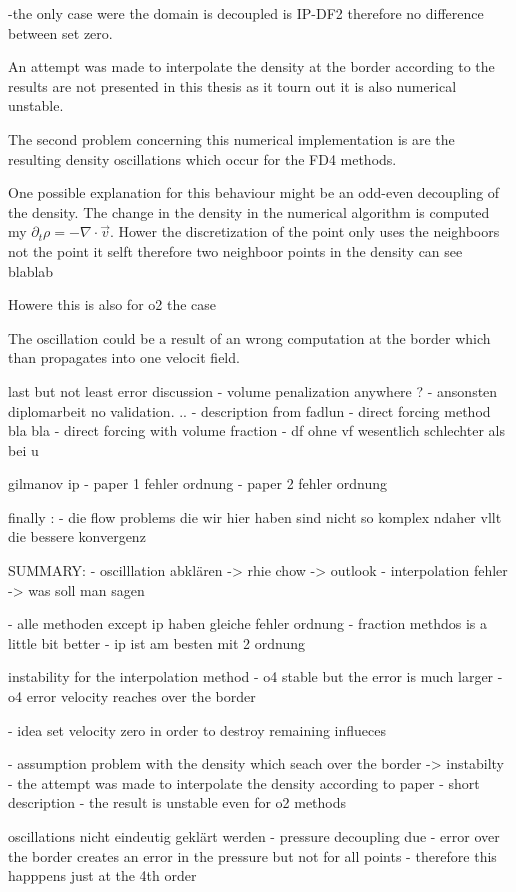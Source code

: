 -the only case were the domain is decoupled is IP-DF2 therefore no difference between set zero.

An attempt was made to interpolate the density at the border according to \citep{PAPER}
the results are not presented in this thesis as it tourn out it is also numerical unstable.

The second problem concerning this numerical implementation is are the resulting density oscillations
which occur for the FD4 methods.

One possible explanation for this behaviour might be an odd-even decoupling of the density.
The change in the density in the numerical algorithm is computed my $\partial_t \rho = -\nabla\cdot \vec{v}$.
Hower the discretization of the point only uses the neighboors not the point it selft
therefore two neighboor points in the density can see blablab

Howere this is also for o2 the case

The oscillation could be a result of an wrong computation at the border which than propagates into one
velocit field.


\clearpage
last but not least error discussion
- volume penalization anywhere ?
- ansonsten diplomarbeit no validation. ..
- description from fadlun
- direct forcing method  bla bla
- direct forcing with volume fraction
- df ohne vf wesentlich schlechter als bei u

gilmanov ip
- paper 1  fehler ordnung
- paper 2 fehler ordnung

finally :
- die flow problems die wir hier haben sind nicht so komplex ndaher
vllt die bessere konvergenz

SUMMARY:
- oscilllation abklären -> rhie chow -> outlook
- interpolation fehler -> was soll man sagen

- alle methoden except ip haben gleiche fehler ordnung
- fraction methdos is a little bit better
- ip ist am besten mit 2 ordnung

instability  for the interpolation method
- o4 stable but the error is much larger
- o4 error velocity reaches over the border

- idea set velocity zero in order to destroy remaining influeces

- assumption problem with the density which seach over the border -> instabilty
- the attempt was made to interpolate the density according to paper
- short description
- the result is unstable even for o2 methods

oscillations nicht eindeutig geklärt werden
- pressure decoupling due
- error  over the border creates an error in the pressure but not for all points
- therefore this happpens just at the 4th order


